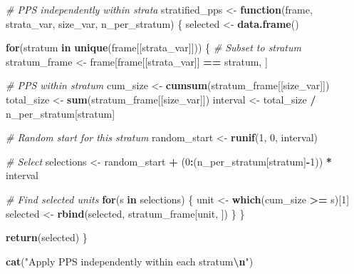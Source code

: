 \documentclass[
]{article}
\newenvironment{Shaded}{\begin{snugshade}}{\end{snugshade}}
\newcommand{\CommentTok}[1]{\textcolor[rgb]{0.56,0.35,0.01}{\textit{#1}}}
\newcommand{\ControlFlowTok}[1]{\textcolor[rgb]{0.13,0.29,0.53}{\textbf{#1}}}
\newcommand{\DecValTok}[1]{\textcolor[rgb]{0.00,0.00,0.81}{#1}}
\newcommand{\FunctionTok}[1]{\textcolor[rgb]{0.13,0.29,0.53}{\textbf{#1}}}
\newcommand{\NormalTok}[1]{#1}
\newcommand{\OtherTok}[1]{\textcolor[rgb]{0.56,0.35,0.01}{#1}}
\newcommand{\SpecialCharTok}[1]{\textcolor[rgb]{0.81,0.36,0.00}{\textbf{#1}}}
\newcommand{\StringTok}[1]{\textcolor[rgb]{0.31,0.60,0.02}{#1}}
\begin{document}
\begin{Shaded}
\begin{Highlighting}[]
\CommentTok{\# PPS independently within strata}
\NormalTok{stratified\_pps }\OtherTok{\textless{}{-}} \ControlFlowTok{function}\NormalTok{(frame, strata\_var, size\_var, n\_per\_stratum) \{}
\NormalTok{  selected }\OtherTok{\textless{}{-}} \FunctionTok{data.frame}\NormalTok{()}
  
  \ControlFlowTok{for}\NormalTok{(stratum }\ControlFlowTok{in} \FunctionTok{unique}\NormalTok{(frame[[strata\_var]])) \{}
    \CommentTok{\# Subset to stratum}
\NormalTok{    stratum\_frame }\OtherTok{\textless{}{-}}\NormalTok{ frame[frame[[strata\_var]] }\SpecialCharTok{==}\NormalTok{ stratum, ]}
    
    \CommentTok{\# PPS within stratum}
\NormalTok{    cum\_size }\OtherTok{\textless{}{-}} \FunctionTok{cumsum}\NormalTok{(stratum\_frame[[size\_var]])}
\NormalTok{    total\_size }\OtherTok{\textless{}{-}} \FunctionTok{sum}\NormalTok{(stratum\_frame[[size\_var]])}
\NormalTok{    interval }\OtherTok{\textless{}{-}}\NormalTok{ total\_size }\SpecialCharTok{/}\NormalTok{ n\_per\_stratum[stratum]}
    
    \CommentTok{\# Random start for this stratum}
\NormalTok{    random\_start }\OtherTok{\textless{}{-}} \FunctionTok{runif}\NormalTok{(}\DecValTok{1}\NormalTok{, }\DecValTok{0}\NormalTok{, interval)}
    
    \CommentTok{\# Select}
\NormalTok{    selections }\OtherTok{\textless{}{-}}\NormalTok{ random\_start }\SpecialCharTok{+}\NormalTok{ (}\DecValTok{0}\SpecialCharTok{:}\NormalTok{(n\_per\_stratum[stratum]}\SpecialCharTok{{-}}\DecValTok{1}\NormalTok{)) }\SpecialCharTok{*}\NormalTok{ interval}
    
    \CommentTok{\# Find selected units}
    \ControlFlowTok{for}\NormalTok{(s }\ControlFlowTok{in}\NormalTok{ selections) \{}
\NormalTok{      unit }\OtherTok{\textless{}{-}} \FunctionTok{which}\NormalTok{(cum\_size }\SpecialCharTok{\textgreater{}=}\NormalTok{ s)[}\DecValTok{1}\NormalTok{]}
\NormalTok{      selected }\OtherTok{\textless{}{-}} \FunctionTok{rbind}\NormalTok{(selected, stratum\_frame[unit, ])}
\NormalTok{    \}}
\NormalTok{  \}}
  
  \FunctionTok{return}\NormalTok{(selected)}
\NormalTok{\}}

\FunctionTok{cat}\NormalTok{(}\StringTok{"Apply PPS independently within each stratum}\SpecialCharTok{\textbackslash{}n}\StringTok{"}\NormalTok{)}
\end{Highlighting}
\end{Shaded}
\end{document}
